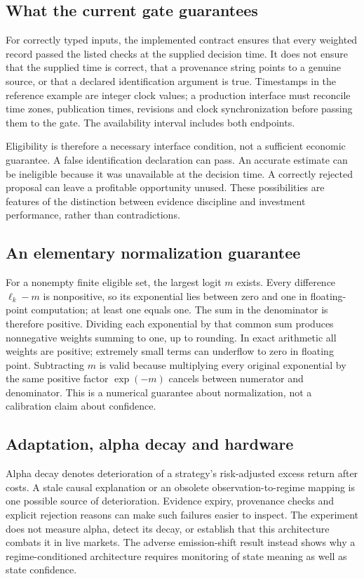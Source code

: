 \subsection{What the current gate guarantees}
For correctly typed inputs, the implemented contract ensures that every weighted record passed the listed checks at the supplied decision time. It does not ensure that the supplied time is correct, that a provenance string points to a genuine source, or that a declared identification argument is true. Timestamps in the reference example are integer clock values; a production interface must reconcile time zones, publication times, revisions and clock synchronization before passing them to the gate. The availability interval includes both endpoints.

Eligibility is therefore a necessary interface condition, not a sufficient economic guarantee. A false identification declaration can pass. An accurate estimate can be ineligible because it was unavailable at the decision time. A correctly rejected proposal can leave a profitable opportunity unused. These possibilities are features of the distinction between evidence discipline and investment performance, rather than contradictions.

\subsection{An elementary normalization guarantee}
For a nonempty finite eligible set, the largest logit $m$ exists. Every difference $\ell_k-m$ is nonpositive, so its exponential lies between zero and one in floating-point computation; at least one equals one. The sum in the denominator is therefore positive. Dividing each exponential by that common sum produces nonnegative weights summing to one, up to rounding. In exact arithmetic all weights are positive; extremely small terms can underflow to zero in floating point. Subtracting $m$ is valid because multiplying every original exponential by the same positive factor $\exp(-m)$ cancels between numerator and denominator. This is a numerical guarantee about normalization, not a calibration claim about confidence.

\subsection{Adaptation, alpha decay and hardware}
Alpha decay denotes deterioration of a strategy's risk-adjusted excess return after costs. A stale causal explanation or an obsolete observation-to-regime mapping is one possible source of deterioration. Evidence expiry, provenance checks and explicit rejection reasons can make such failures easier to inspect. The experiment does not measure alpha, detect its decay, or establish that this architecture combats it in live markets. The adverse emission-shift result instead shows why a regime-conditioned architecture requires monitoring of state meaning as well as state confidence.

